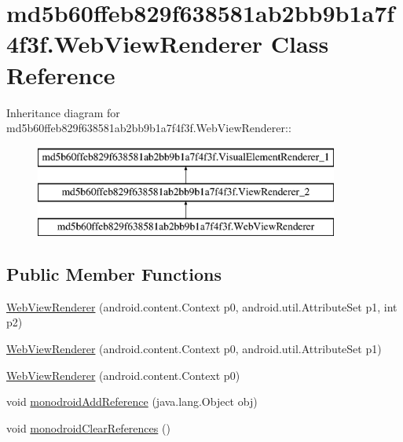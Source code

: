 \hypertarget{classmd5b60ffeb829f638581ab2bb9b1a7f4f3f_1_1_web_view_renderer}{
\section{md5b60ffeb829f638581ab2bb9b1a7f4f3f.WebViewRenderer Class Reference}
\label{classmd5b60ffeb829f638581ab2bb9b1a7f4f3f_1_1_web_view_renderer}
}
Inheritance diagram for md5b60ffeb829f638581ab2bb9b1a7f4f3f.WebViewRenderer::\begin{figure}[H]
\begin{center}
\leavevmode
\includegraphics[height=3cm]{classmd5b60ffeb829f638581ab2bb9b1a7f4f3f_1_1_web_view_renderer}
\end{center}
\end{figure}
\subsection*{Public Member Functions}
\begin{CompactItemize}
\item 
\hyperlink{classmd5b60ffeb829f638581ab2bb9b1a7f4f3f_1_1_web_view_renderer_efd07d6eeb7a2a7eba83ec8f30ddf5a0}{WebViewRenderer} (android.content.Context p0, android.util.AttributeSet p1, int p2)
\item 
\hyperlink{classmd5b60ffeb829f638581ab2bb9b1a7f4f3f_1_1_web_view_renderer_5d31cef44bb6ebaec7f75139c55577ac}{WebViewRenderer} (android.content.Context p0, android.util.AttributeSet p1)
\item 
\hyperlink{classmd5b60ffeb829f638581ab2bb9b1a7f4f3f_1_1_web_view_renderer_d389d22a1a6485d39e52a0d587ca519b}{WebViewRenderer} (android.content.Context p0)
\item 
void \hyperlink{classmd5b60ffeb829f638581ab2bb9b1a7f4f3f_1_1_web_view_renderer_395da0b1470b8a8d7fe3d8f11678dd44}{monodroidAddReference} (java.lang.Object obj)
\item 
void \hyperlink{classmd5b60ffeb829f638581ab2bb9b1a7f4f3f_1_1_web_view_renderer_554c17e18aeffc2dcd3b9899551fd449}{monodroidClearReferences} ()
\end{CompactItemize}
